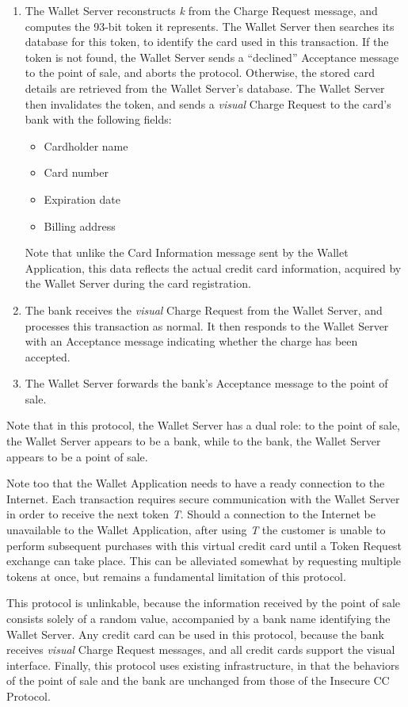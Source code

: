 \begin{enumerate}
\item The Wallet Server reconstructs \emph{k} from the Charge Request message, and computes the 93-bit token it represents.
    The Wallet Server then searches its database for this token, to identify the card used in this transaction.
    If the token is not found, the Wallet Server sends a ``declined'' Acceptance message to the point of sale, and aborts the protocol.
    Otherwise, the stored card details are retrieved from the Wallet Server's database.
    The Wallet Server then invalidates the token, and sends a \emph{visual} Charge Request to the card's bank with the following fields:
    \begin{itemize}
    \item Cardholder name
    \item Card number
    \item Expiration date
    \item Billing address
    \end{itemize}
    Note that unlike the Card Information message sent by the Wallet Application, this data reflects the actual credit card information,
        acquired by the Wallet Server during the card registration.

\item The bank receives the \emph{visual} Charge Request from the Wallet Server, and processes this transaction as normal.
    It then responds to the Wallet Server with an Acceptance message indicating whether the charge has been accepted.

\item The Wallet Server forwards the bank's Acceptance message to the point of sale.
\end{enumerate}

Note that in this protocol, the Wallet Server has a dual role:
to the point of sale, the Wallet Server appears to be a bank, while to the bank, the Wallet Server appears to be a point of sale.

Note too that the Wallet Application needs to have a ready connection to the Internet.
Each transaction requires secure communication with the Wallet Server in order to receive the next token \emph{T}.
Should a connection to the Internet be unavailable to the Wallet Application,
    after using \emph{T} the customer is unable to perform subsequent purchases with this virtual credit card until a Token Request exchange can take place.
This can be alleviated somewhat by requesting multiple tokens at once, but remains a fundamental limitation of this protocol.

This protocol is unlinkable,
    because the information received by the point of sale consists solely of a random value, accompanied by a bank name identifying the Wallet Server.
Any credit card can be used in this protocol,
    because the bank receives \emph{visual} Charge Request messages, and all credit cards support the visual interface.
Finally, this protocol uses existing infrastructure,
    in that the behaviors of the point of sale and the bank are unchanged from those of the Insecure CC Protocol.
